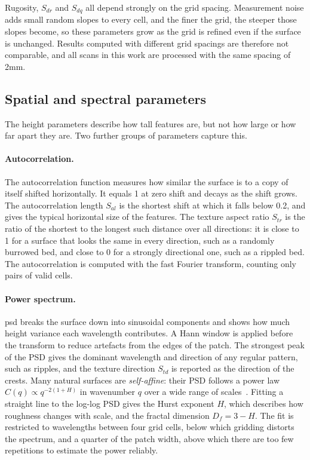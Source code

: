 Rugosity, $S_{dr}$ and $S_{dq}$ all depend strongly on the grid spacing. Measurement noise adds small random slopes to every cell, and the finer the grid, the steeper those slopes become, so these parameters grow as the grid is refined even if the surface is unchanged. Results computed with different grid spacings are therefore not comparable, and all scans in this work are processed with the same spacing of 2mm.

\subsection{Spatial and spectral parameters}

The height parameters describe how tall features are, but not how large or how far apart they are. Two further groups of parameters capture this.

\paragraph{Autocorrelation.} The autocorrelation function measures how similar the surface is to a copy of itself shifted horizontally. It equals 1 at zero shift and decays as the shift grows. The autocorrelation length $S_{al}$ is the shortest shift at which it falls below 0.2, and gives the typical horizontal size of the features. The texture aspect ratio $S_{tr}$ is the ratio of the shortest to the longest such distance over all directions: it is close to 1 for a surface that looks the same in every direction, such as a randomly burrowed bed, and close to 0 for a strongly directional one, such as a rippled bed. The autocorrelation is computed with the fast Fourier transform, counting only pairs of valid cells.

\paragraph{Power spectrum.} \gls{psd} breaks the surface down into sinusoidal components and shows how much height variance each wavelength contributes. A Hann window is applied before the transform to reduce artefacts from the edges of the patch. The strongest peak of the PSD gives the dominant wavelength and direction of any regular pattern, such as ripples, and the texture direction $S_{td}$ is reported as the direction of the crests. Many natural surfaces are \emph{self-affine}: their PSD follows a power law $C(q) \propto q^{-2(1+H)}$ in wavenumber $q$ over a wide range of scales~\citep{perssonNatureSurfaceRoughness2004}. Fitting a straight line to the log-log PSD gives the Hurst exponent $H$, which describes how roughness changes with scale, and the fractal dimension $D_f = 3 - H$. The fit is restricted to wavelengths between four grid cells, below which gridding distorts the spectrum, and a quarter of the patch width, above which there are too few repetitions to estimate the power reliably.

